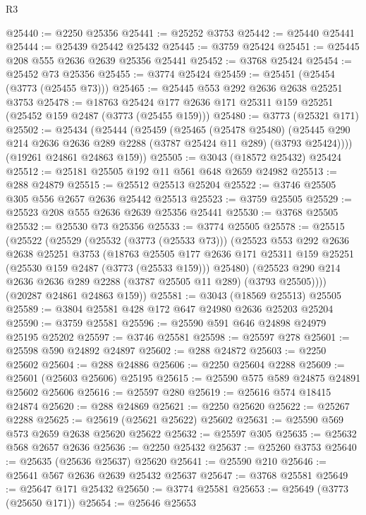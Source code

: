 \begin{lexlean}{R3}
\begin{coremodule}
@25440 := @2250 @25356
@25441 := @25252 @3753
@25442 := @25440 @25441
@25444 := @25439 @25442 @25432
@25445 := @3759 @25424
@25451 := @25445 @208 @555 @2636 @2639 @25356 @25441
@25452 := @3768 @25424
@25454 := @25452 @73 @25356
@25455 := @3774 @25424
@25459 := @25451 (@25454 (@3773 (@25455 @73)))
@25465 := @25445 @553 @292 @2636 @2638 @25251 @3753
@25478 := @18763 @25424 @177 @2636 @171 @25311 @159 @25251 (@25452 @159 @2487 (@3773 (@25455 @159)))
@25480 := @3773 (@25321 @171)
@25502 := @25434
    (@25444
      (@25459
        (@25465
          (@25478 @25480)
          (@25445 @290 @214 @2636 @2636 @289 @2288 (@3787 @25424 @11 @289) (@3793 @25424))))
      (@19261 @24861 @24863 @159))
@25505 := @3043 (@18572 @25432) @25424
@25512 := @25181 @25505 @192 @11 @561 @648 @2659 @24982
@25513 := @288 @24879
@25515 := @25512 @25513 @25204
@25522 := @3746 @25505 @305 @556 @2657 @2636 @25442 @25513
@25523 := @3759 @25505
@25529 := @25523 @208 @555 @2636 @2639 @25356 @25441
@25530 := @3768 @25505
@25532 := @25530 @73 @25356
@25533 := @3774 @25505
@25578 := @25515
    (@25522
      (@25529
        (@25532 (@3773 (@25533 @73)))
        (@25523
          @553
          @292
          @2636
          @2638
          @25251
          @3753
          (@18763
            @25505
            @177
            @2636
            @171
            @25311
            @159
            @25251
            (@25530 @159 @2487 (@3773 (@25533 @159)))
            @25480)
          (@25523 @290 @214 @2636 @2636 @289 @2288 (@3787 @25505 @11 @289) (@3793 @25505))))
      (@20287 @24861 @24863 @159))
@25581 := @3043 (@18569 @25513) @25505
@25589 := @3804 @25581 @428 @172 @647 @24980 @2636 @25203 @25204
@25590 := @3759 @25581
@25596 := @25590 @591 @646 @24898 @24979 @25195 @25202
@25597 := @3746 @25581
@25598 := @25597 @278
@25601 := @25598 @590 @24892 @24897
@25602 := @288 @24872
@25603 := @2250 @25602
@25604 := @288 @24886
@25606 := @2250 @25604 @2288
@25609 := @25601 (@25603 @25606) @25195
@25615 := @25590 @575 @589 @24875 @24891 @25602 @25606
@25616 := @25597 @280
@25619 := @25616 @574 @18415 @24874
@25620 := @288 @24869
@25621 := @2250 @25620
@25622 := @25267 @2288
@25625 := @25619 (@25621 @25622) @25602
@25631 := @25590 @569 @573 @2659 @2638 @25620 @25622
@25632 := @25597 @305
@25635 := @25632 @568 @2657 @2636
@25636 := @2250 @25432
@25637 := @25260 @3753
@25640 := @25635 (@25636 @25637) @25620
@25641 := @25590 @210
@25646 := @25641 @567 @2636 @2639 @25432 @25637
@25647 := @3768 @25581
@25649 := @25647 @171 @25432
@25650 := @3774 @25581
@25653 := @25649 (@3773 (@25650 @171))
@25654 := @25646 @25653

\end{coremodule}
\end{lexlean}
